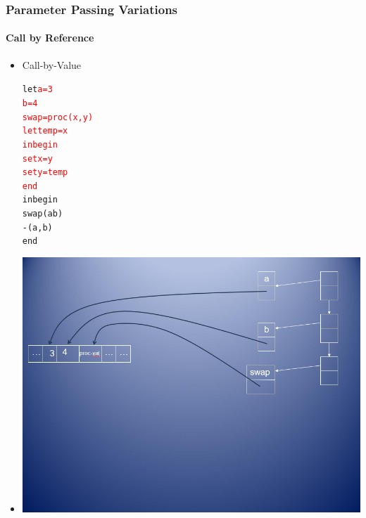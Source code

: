 \documentclass{beamer}
\begin{document}
\begin{frame}[fragile]
\frametitle{Parameter Passing Variations}
\framesubtitle{Call by Reference}
\begin{scriptsize}
\begin{itemize}
\item<1-> Call-by-Value
\begin{alltt}
\begin{tiny}
let \textcolor{red}{a = 3
    b = 4
    swap = proc (x, y)
	        let temp = x
	        in begin
	             set x = y
	             set y = temp
	           end}
in begin
     swap(a b)
     -(a, b)
   end
\end{tiny}
\end{alltt}

\item<1->
\begin{center}
\includegraphics[scale=0.35]{cbv-cbr1.jpg}
\end{center}

\end{itemize}
\end{scriptsize}
\end{frame}
\end{document}
